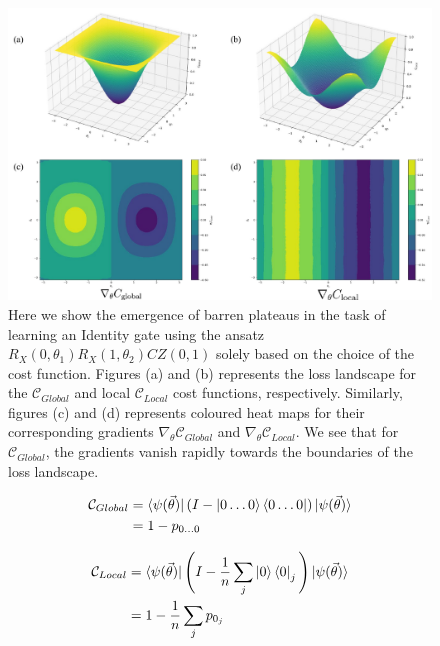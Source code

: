 \begin{figure}[ht]
    \centering
    \includegraphics[width=\linewidth]{figures/qleet/barren-plateau.pdf}
    \caption[Presence of barren plateaus in parameterized quantum circuits]{Here we show the emergence of barren plateaus in the task of learning an Identity gate using the ansatz $R_X(0,\theta_1)R_X(1, \theta_2)CZ(0, 1)$ solely based on the choice of the cost function. Figures (a) and (b) represents the loss landscape for the $\mathcal{C}_{Global}$ and local $\mathcal{C}_{Local}$ cost functions, respectively. Similarly, figures (c) and (d) represents coloured heat maps for their  corresponding gradients $\nabla_{\theta}\mathcal{C}_{Global}$ and $\nabla_{\theta}\mathcal{C}_{Local}$. We see that for $\mathcal{C}_{Global}$, the gradients vanish rapidly towards the boundaries of the loss landscape.}
    \label{qleet-fig:barren-plateau}
\end{figure}

\begin{equation}
\begin{split}
    \mathcal{C}_{Global} &= \bra{\psi(\vec{\theta})} (I - \ket{0\ldots0}\bra{0\ldots0}) \ket{\psi(\vec{\theta})} \\
    &= 1 - p_{0\ldots0}
\end{split}
\end{equation}

\begin{equation}
\begin{split}
    \mathcal{C}_{Local} &= \bra{\psi(\vec{\theta})} \Bigg(I - \frac{1}{n}\sum_j \ket{0}\bra{0}_j\Bigg) \ket{\psi(\vec{\theta})} \\
    &= 1 - \frac{1}{n}\sum_j p_{0_j}
\end{split}
\end{equation}

